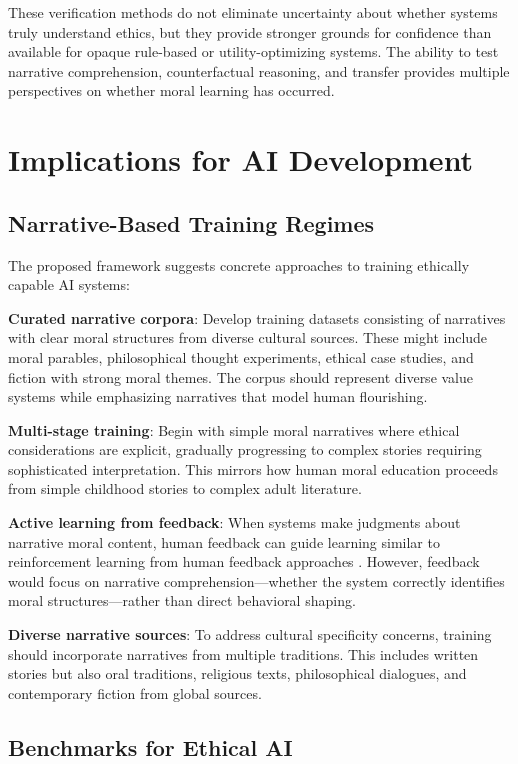 \documentclass[12pt]{article}
\begin{document}
These verification methods do not eliminate uncertainty about whether systems truly understand ethics, but they provide stronger grounds for confidence than available for opaque rule-based or utility-optimizing systems. The ability to test narrative comprehension, counterfactual reasoning, and transfer provides multiple perspectives on whether moral learning has occurred.

\section{Implications for AI Development}

\subsection{Narrative-Based Training Regimes}

The proposed framework suggests concrete approaches to training ethically capable AI systems:

\textbf{Curated narrative corpora}: Develop training datasets consisting of narratives with clear moral structures from diverse cultural sources. These might include moral parables, philosophical thought experiments, ethical case studies, and fiction with strong moral themes. The corpus should represent diverse value systems while emphasizing narratives that model human flourishing.

\textbf{Multi-stage training}: Begin with simple moral narratives where ethical considerations are explicit, gradually progressing to complex stories requiring sophisticated interpretation. This mirrors how human moral education proceeds from simple childhood stories to complex adult literature.

\textbf{Active learning from feedback}: When systems make judgments about narrative moral content, human feedback can guide learning similar to reinforcement learning from human feedback approaches \citep{christiano2017deep}. However, feedback would focus on narrative comprehension—whether the system correctly identifies moral structures—rather than direct behavioral shaping.

\textbf{Diverse narrative sources}: To address cultural specificity concerns, training should incorporate narratives from multiple traditions. This includes written stories but also oral traditions, religious texts, philosophical dialogues, and contemporary fiction from global sources.

\subsection{Benchmarks for Ethical AI}
\end{document}
